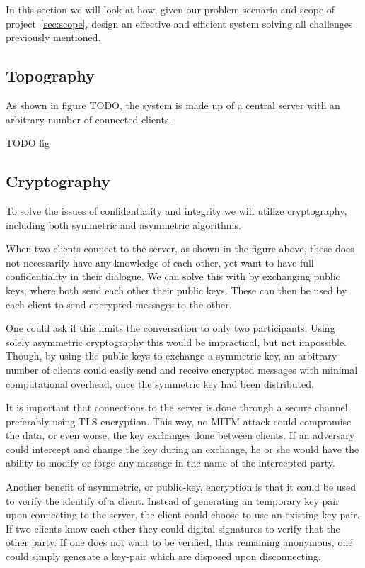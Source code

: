 
In this section we will look at how, given our problem
scenario and scope of project~\ref{sec:scope},
design an effective and efficient system solving all
challenges previously mentioned.


\subsection{Topography}

As shown in figure TODO, the system is made up of
a central server with an arbitrary number of connected clients.

TODO fig


\subsection{Cryptography}

To solve the issues of confidentiality and integrity we will utilize
cryptography, including both symmetric and asymmetric algorithms.

When two clients connect to the server, as shown in the figure
above, these does not necessarily have any
knowledge of each other, yet want to have full confidentiality in
their dialogue. We can solve this with by exchanging public keys,
where both send each other their public keys. These can then be used
by each client to send encrypted messages to the other.

One could ask if this limits the conversation to only two
participants. Using solely asymmetric cryptography this would be
impractical, but not impossible. Though, by using the public keys to
exchange a symmetric key, an arbitrary number of clients could easily
send and receive encrypted messages with minimal computational
overhead, once the symmetric key had been distributed.

It is important that connections to the server is done through a
secure channel, preferably using TLS encryption. This way, no MITM
attack could compromise the data, or even worse, the key exchanges
done between clients. If an adversary could intercept and change the
key during an exchange, he or she would have the ability to modify or
forge any message in the name of the intercepted party.

Another benefit of asymmetric, or public-key, encryption is that it
could be used to verify the identify of a client. Instead of
generating an temporary key pair upon connecting to the server, the
client could choose to use an existing key pair. If two clients know
each other they could digital signatures to verify that the other
party. If one does not want to be verified, thus remaining anonymous,
one could simply generate a key-pair which are disposed upon
disconnecting.

